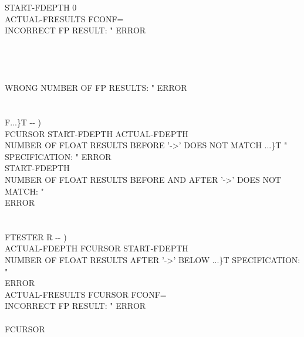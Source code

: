 \begin{tt}
\tab[4]    START-FDEPTH  \word{-} 0  \\
\tab[5]    ACTUAL-FRESULTS   \word{+}  FCONF=   \\
\tab[6]      INCORRECT FP RESULT: " ERROR  \\
\tab[5]     \\
\tab[4]    \\
\tab[3]   \\
\tab[2]  \\
\tab[3]   WRONG NUMBER OF FP RESULTS: " ERROR \\
\tab[2]  \word{;} \\
\\
\tab \word{:} F...\}T  -{}- ) \\
\tab[2] FCURSOR  START-FDEPTH  \word{+} ACTUAL-FDEPTH    \\
\tab[2]    NUMBER OF FLOAT RESULTS BEFORE '->' DOES NOT MATCH ...\}T " \\
\tab[2]    SPECIFICATION: " ERROR \\
\tab[2]   START-FDEPTH  \word{=}   \\
\tab[2]    NUMBER OF FLOAT RESULTS BEFORE AND AFTER '->' DOES NOT MATCH: " \\
\tab[2]   ERROR \\
\tab[2]   \word{;} \\
\\
\tab \word{:} FTESTER  R -{}- ) \\
\tab[2]   ACTUAL-FDEPTH  FCURSOR  START-FDEPTH  \word{+}     \\
\tab[2]    NUMBER OF FLOAT RESULTS AFTER '->' BELOW ...\}T SPECIFICATION: " \\
\tab[2]   ERROR  \\
\tab[2]  ACTUAL-FRESULTS FCURSOR   \word{+}  FCONF=   \\
\tab[2]    INCORRECT FP RESULT: " ERROR \\
\tab[2]   \\
 FCURSOR \word{+!} \word{;} \\
\\

\end{tt}
